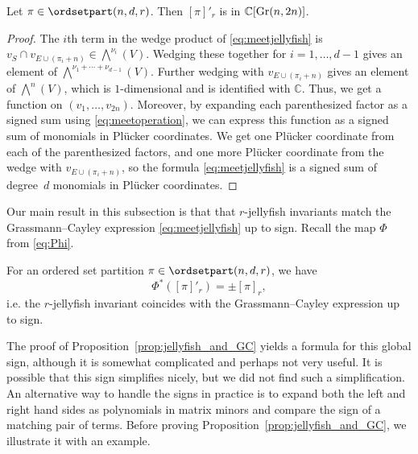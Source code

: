 \begin{lemma}
   Let $\pi \in \ordsetpart(n,d,r)$. Then $[\pi]'_r$ is in $\mathbb{C}[{\rm Gr}(n,2n)]$.
\end{lemma}
\begin{proof}
The $i$th term in the wedge product of \eqref{eq:meetjellyfish} is $ v_{S} \cap v_{E \cup (\pi_i+n)} \in \bigwedge^{\nu_i}(V)$. Wedging these together for $i=1,\dots,d-1$ gives an element of $\bigwedge^{\nu_1+\cdots +\nu_{d-1}}(V)$. Further wedging with $v_{E \cup (\pi_i+n)}$ gives an element of 
$\bigwedge^{n}(V)$, which is $1$-dimensional and is identified with $\mathbb{C}$. Thus, we get a function on $(v_1,\dots,v_{2n})$. Moreover, by expanding each parenthesized factor as a signed sum using \eqref{eq:meetoperation}, we can express this function as a signed sum of monomials in Pl\"ucker coordinates. We get one Pl\"ucker coordinate from each of the parenthesized factors, and one more Pl\"ucker coordinate from the wedge with $v_{E \cup (\pi_i+n)}$, so the formula \eqref{eq:meetjellyfish} is a signed sum of degree~$d$ monomials in Pl\"ucker coordinates. 
\end{proof}

Our main result in this subsection is that that $r$-jellyfish invariants match the Grassmann--Cayley expression \eqref{eq:meetjellyfish} up to sign. Recall the map $\Phi$ from \eqref{eq:Phi}.
\begin{proposition}\label{prop:jellyfish_and_GC}
For an ordered set partition $\pi \in \ordsetpart(n,d,r)$, we have 
$$\Phi^*([\pi]'_r) = \pm [\pi]_r,$$
i.e. the $r$-jellyfish invariant coincides with the Grassmann--Cayley expression up to sign.
\end{proposition}

The proof of Proposition~\ref{prop:jellyfish_and_GC} yields a formula for this global sign, although it is somewhat complicated and perhaps not very useful. It is possible that this sign simplifies nicely, but we did not find such a simplification. An alternative way to handle the signs in practice is to expand both the left and right hand sides as polynomials in matrix minors and compare the sign of a matching pair of terms. Before proving Proposition~\ref{prop:jellyfish_and_GC}, we illustrate it with an example. 

